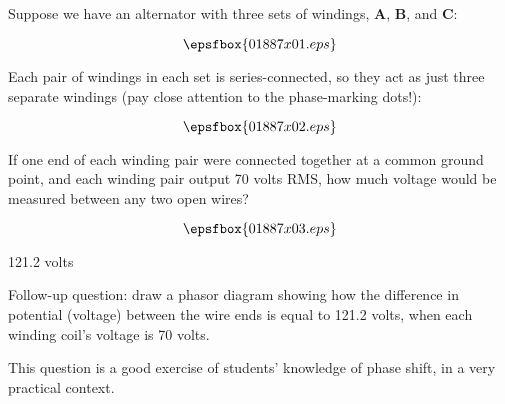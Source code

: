 

Suppose we have an alternator with three sets of windings, {\bf A}, {\bf B}, and {\bf C}:

$$\epsfbox{01887x01.eps}$$

Each pair of windings in each set is series-connected, so they act as just three separate windings (pay close attention to the phase-marking dots!):

$$\epsfbox{01887x02.eps}$$

If one end of each winding pair were connected together at a common ground point, and each winding pair output 70 volts RMS, how much voltage would be measured between any two open wires?

$$\epsfbox{01887x03.eps}$$







121.2 volts

\vskip 10pt

Follow-up question: draw a phasor diagram showing how the difference in potential (voltage) between the wire ends is equal to 121.2 volts, when each winding coil's voltage is 70 volts.







This question is a good exercise of students' knowledge of phase shift, in a very practical context.




